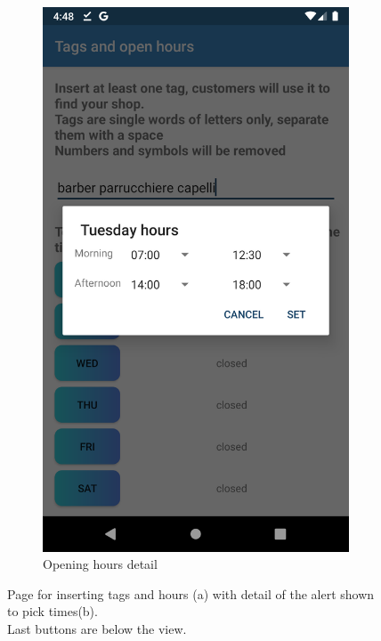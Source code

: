 \begin{figure}[h]
\begin{subfigure}{.5\textwidth}
  \includegraphics[height=.4\textheight, keepaspectratio=true]{Img/Screens/Registration_Shop3}
  \caption{Opening hours detail}
\end{subfigure}
\caption{Page for inserting tags and hours (a) with detail of the alert shown to pick times(b).\\Last buttons are below the view.}
\end{figure}


